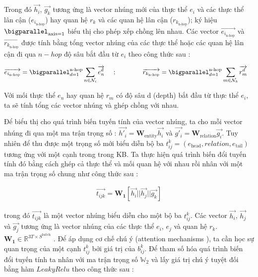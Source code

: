 Trong đó $\overrightarrow{h_i}$, $\overrightarrow{g_k}$ tương ứng là vector nhúng mới của thực thể $e_i$ và các thực thể lân cận ($e_{i_{\text{n-hop}}}$) hay quan hệ $r_k$ và các quan hệ lân cận ($r_{k_{\text{n-hop}}}$); ký hiệu $\bigparallel_{\text{axis}=1}$ biểu thị cho phép xếp chồng lên nhau. Các vector $\overrightarrow{e_{i_{\text{n-hop}}}}$ và $\overrightarrow{r_{k_{\text{n-hop}}}}$ được tính bằng tổng vector nhúng của các thực thể hoặc các quan hệ lân cận đi qua $n-hop$ độ sâu bắt đầu từ $e_i$ theo công thức sau : 

\begin{align}
{\overrightarrow{e_{i_{\text{n-hop}}}} = \bigparallel_{d=1}^{\text{n-hop}} \sum_{n \in \mathcal{N}_i} \overrightarrow{e_n^d}} \hspace{0.5cm};\hspace{1.5cm}&
{\overrightarrow{r_{k_{\text{n-hop}}}} = \bigparallel_{d=1}^{\text{n-hop}} \sum_{m \in \mathcal{N}_k} \overrightarrow{r_m^d}}
\end{align}

Với mối thực thể $e_n$ hay quan hệ $r_m$ có độ sâu d (depth) bắt đầu từ thực thể $e_i$, ta sẽ tính tổng các vector nhúng và ghép chồng với nhau.

Để biểu thị cho quá trình biến tuyến tính của vector nhúng, ta cho mỗi vector nhúng đi qua một ma trận trọng số : $\overrightarrow{h'_i} = \mathbf{W}_{\text{entity}} \overrightarrow{h_i}$ 
và $\overrightarrow{g'_i} = \mathbf{W}_{\text{relation}} \overrightarrow{g_i}$. Tuy nhiên để thu được một trọng số mới biểu diễn bộ ba $t^k_{ij} = (e_{\text{head}}, relation, e_{\text{tail}})$ tương ứng với một cạnh trong trong KB. Ta thực hiện quá trình biến đổi tuyến tính đó bằng cách ghép cả thực thể và mối quan hệ với nhau rồi nhân với một ma trận trọng số chung như công thức sau :

\begin{align}
\overrightarrow{t_{ijk}} = \mathbf{W_1} [\overrightarrow{h_i} || \overrightarrow{h_j} || \overrightarrow{g_k}]
\end{align}

trong đó $\overrightarrow{t_{ijk}}$ là một vector nhúng biểu diễn cho một bộ ba $t^k_{ij}$. Các vector $\overrightarrow{h_i}$, $\overrightarrow{h_j}$ và $\overrightarrow{g_j}$ tương ứng là vector nhúng của các thực thể $e_i$, $e_j$ và quan hệ $r_k$. $\mathbf{W_1} \in \mathbb{R}^{3 T \times S^\text{batch}}$ . Để áp dụng cơ chế chú ý (attention mechanisms \cite{vaswani2017attention}), ta cần học sự quan trọng của một cạnh $t_{ij}^k$ bởi giá trị của $b_{ij}^k$. Để tham số hóa quá trình biến đổi tuyến tính ta nhân với ma trận trọng số $\mathbb{W}_{2}$ và lấy giá trị chú ý tuyệt đối bằng hàm $LeakyRelu$ theo công thức sau :

